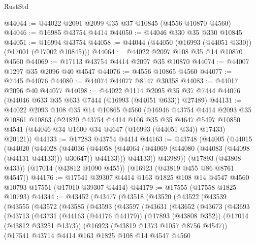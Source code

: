 \begin{lexlean}{RustStd}
\begin{coremodule}
@44044 := @44022 @2091 @2099 @35 @37 @10845 (@4556 @10870 @4560)
@44046 := @16985 @43754 @4414
@44050 := @44046 @330 @35 @330 @10845
@44051 := @16994 @43754
@44058 := @44044 (@44050 (@16993 (@44051 @330)) (@17001 (@17002 @10845)))
@44064 := @44022 @2097 @108 @35 @14 @10870 @4560
@44069 := @17113 @43754 @4414 @2097 @35 @10870
@44074 := @44007 @1297 @35 @2096 @40 @4547
@44076 := @4556 @10865 @4560
@44077 := @7445 @44076
@44080 := @44074 @44077 @8147 @30358
@44083 := @44017 @2096 @40 @44077
@44098 := @44022
    @1114
    @2095
    @35
    @37
    @7444
    @44076
    (@44046 @633 @35 @633 @7444 (@16993 (@44051 @633)) @27489)
@44131 := @44022
    @2093
    @108
    @35
    @14
    @10865
    @4560
    (@16946
      @43754
      @4414
      @2093
      @35
      @10861
      @10863
      (@24820
        @43754
        @4414
        @106
        @35
        @35
        @4647
        @5497
        @10850
        @4541
        (@44046 @34 @1600 @34 @4647 (@16993 (@44051 @34)) @17433)
        @20121))
@44133 := @17283 @43754 @4414
@44163 := @43748
    (@44005
      (@44015
        (@44020
          (@44028
            (@44036
              (@44058 (@44064 (@44069 (@44080 (@44083 (@44098 (@44131 @44133))) @30647)) @44133)))
            @44133))
        @43989))
    (@17893 (@43808 @433))
    (@17014 (@43812 @1090 @455))
    (@16923 (@43819 @455 @86 @8761 @4547))
@44176 := @17541 @39307 @4414 @163 @1825 @108 @14 @4547 @4560 @10793 @17551 (@17010 @39307 @4414)
@44179 := @17555 (@17558 @1825 @10793)
@44344 := @43452
    (@43477
      (@43518
        (@43520
          (@43522
            (@43539
              (@43555
                (@43572
                  (@43585
                    (@43593
                      (@43597
                        (@43631
                          (@43652
                            (@43673
                              (@43693
                                (@43713
                                  (@43731
                                    (@44163 (@44176 @44179))
                                    (@17893 (@43808 @352))
                                    (@17014 (@43812 @33251 @1373))
                                    (@16923 (@43819 @1373 @1057 @8756 @4547))
                                    (@17541
                                      @43714
                                      @4414
                                      @163
                                      @1825
                                      @108
                                      @14
                                      @4547
                                      @4560

\end{coremodule}
\end{lexlean}
